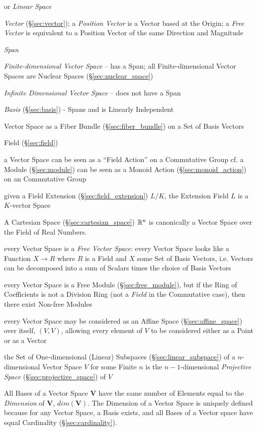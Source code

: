 or \emph{Linear Space}

\emph{Vector} (\S\ref{sec:vector}); a \emph{Position Vector} is a Vector based
at the Origin; a \emph{Free Vector} is equivalent to a Position Vector of the
same Direction and Magnitude

\emph{Span}

\emph{Finite-dimensional Vector Space} -- has a Span; all
Finite-dimensional Vector Spaces are Nuclear Spaces
(\S\ref{sec:nuclear_space})

\emph{Infinite Dimensional Vector Space} -- does not have a Span

\emph{Basis} (\S\ref{sec:basis}) - Spans and is Linearly Independent

Vector Space as a Fiber Bundle (\S\ref{sec:fiber_bundle}) on a Set of Basis
Vectors

Field (\S\ref{sec:field})

a Vector Space can be seen as a ``Field Action'' on a Commutative Group cf. a
Module (\S\ref{sec:module}) can be seen as a Monoid Action
(\S\ref{sec:monoid_action}) on an Commutative Group

given a Field Extension (\S\ref{sec:field_extension}) $L/K$, the Extension Field
$L$ is a $K$-vector Space

A Cartesian Space (\S\ref{sec:cartesian_space}) $\mathbb{R}^n$ is canonically a
Vector Space over the Field of Real Numbers.

every Vector Space is a \emph{Free Vector Space}: every Vector Space
looks like a Function $X \rightarrow R$ where $R$ is a Field and $X$
some Set of Basis Vectors, i.e. Vectors can be decomposed into a sum
of Scalars times the choice of Basis Vectors %

every Vector Space is a Free Module (\S\ref{sec:free_module}), but if the Ring
of Coefficients is not a Division Ring (not a \emph{Field} in the Commutative
case), then there exist Non-free Modules

every Vector Space may be considered as an Affine Space
(\S\ref{sec:affine_space}) over itself, $(V,V)$, allowing every element of $V$
to be considered either as a Point or as a Vector

the Set of One-dimensional (Linear) Subspaces (\S\ref{sec:linear_subspace}) of a
$n$-dimensional Vector Space $V$ for some Finite $n$ is the $n-1$-dimensional
\emph{Projective Space} (\S\ref{sec:projective_space}) of $V$

All Bases of a Vector Space $\mathbf{V}$ have the same number of
Elements equal to the \emph{Dimension} of $\mathbf{V}$,
$dim(\mathbf{V})$. The Dimension of a Vector Space is uniquely defined
because for any Vector Space, a Basis exists, and all Bases of a
Vector space have equal Cardinality (\S\ref{sec:cardinality}).

